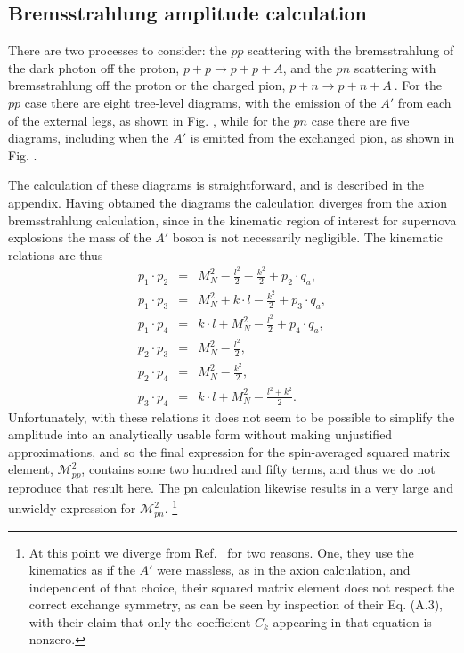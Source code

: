 \documentclass[nofootinbib,prd,superscriptaddress,twocolumn]{revtex4}
\newcommand{\bea}{\begin{eqnarray}}
\newcommand{\eea}{\end{eqnarray}}
\begin{document}
\subsection{Bremsstrahlung amplitude calculation}
	 There are two processes to consider: the $pp$ scattering with the bremsstrahlung of the dark photon off the proton, $ p+p \rightarrow p+p+A$, and the $pn$ scattering with bremsstrahlung off the proton or the charged pion, $ p+n \rightarrow p+n+A\ $. For the $pp$ case there are eight tree-level diagrams, with the emission of the $A'$ from each of the external legs, as shown in Fig. , while for the $pn$ case there are five diagrams, including when the $A'$ is emitted from the exchanged pion, as shown in Fig. .
	
The calculation of these diagrams is straightforward, and is described in the appendix. Having obtained the diagrams the calculation diverges from the axion bremsstrahlung calculation, since in the kinematic region of interest for supernova explosions the mass of the $A'$ boson is not necessarily negligible. The kinematic relations are thus \bea 
p_1 \cdot p_2 &=& M_N^2 - \frac{l^2}{2} - \frac{k^2}{2} + p_2 \cdot q_a,\\
p_1 \cdot p_3 &=& M_N^2 + k \cdot l - \frac{k^2}{2} + p_3 \cdot q_a,\\  
p_1 \cdot p_4 &=& k \cdot l + M_N^2 - \frac{l^2}{2} + p_4 \cdot q_a, \\
p_2 \cdot p_3 &=& M_N^2 - \frac{l^2}{2}, \\ 
p_2 \cdot p_4 &=& M_N^2 - \frac{k^2}{2},\\
p_3 \cdot p_4 &=& k \cdot l + M_N^2 - \frac{l^2 + k^2}{2}.
\eea
Unfortunately, with these relations it does not seem to be possible to simplify the amplitude into an analytically usable form without making unjustified approximations, and so the final expression for the spin-averaged squared matrix element, $ \mathcal{M}^2_{pp}$, contains some two hundred and fifty terms, and thus we do not reproduce that result here. The pn calculation likewise results in a very large and unwieldy expression for $ \mathcal{M}^2_{pn}$. \footnote{At this point we diverge from Ref.~\cite{dent_etal12} for two reasons.  One, they use the kinematics as if the $A'$ were massless, as in the axion calculation, and independent of that choice, their squared matrix element does not respect the correct exchange symmetry, as can be seen by inspection of their Eq. (A.3), with their claim that only the coefficient $C_k$ appearing in that equation is nonzero.}
\end{document}
